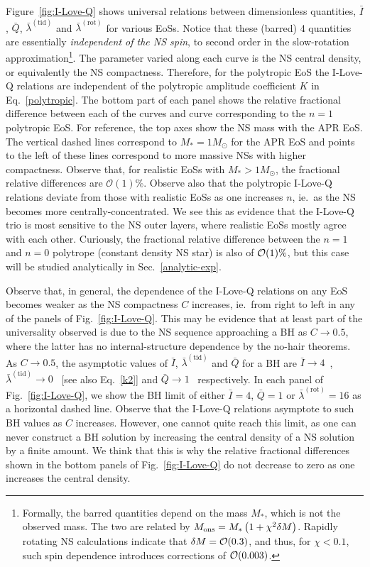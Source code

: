 \documentclass[aps,twocolumn,nofootinbib,showpacs,superscriptaddress,hyperref]{revtex4-1}
\newcommand{\NS}{*}
\newcommand{\tid}{\mathrm{(tid)}}
\newcommand{\rot}{\mathrm{(rot)}}
\newcommand{\Ibar}{\bar{I}}
\newcommand{\Qbar}{\bar{Q}}
\newcommand{\lambdabarrot}{\bar{\lambda}^\mathrm{(rot)}}
\begin{document}
Figure~\ref{fig:I-Love-Q} shows universal relations between dimensionless quantities, $\bar{I}$, $\Qbar$, $\bar{\lambda}^\tid$ and $\bar{\lambda}^\rot$ for various EoSs. Notice that these (barred) 4 quantities are essentially {\emph{independent of the NS spin}}, to second order in the slow-rotation approximation\footnote{Formally, the barred quantities depend on the mass $M_{*}$, which is not the observed mass. The two are related by $M_{\rm ons} = M_{*} \left(1 + \chi^{2} \delta M\right)$. Rapidly rotating NS calculations indicate that $\delta M = {\cal{O}}(0.3)$, and thus, for $\chi < 0.1$, such spin dependence introduces corrections of ${\cal{O}}(0.003)$.}.  The parameter varied along each curve is the NS central density, or equivalently the NS compactness. Therefore, for the polytropic EoS the I-Love-Q relations are independent of the polytropic amplitude coefficient $K$ in Eq.~\eqref{polytropic}. The bottom part of each panel shows the relative fractional difference between each of the curves and curve corresponding to the $n=1$ polytropic EoS. For reference, the top axes show the NS mass with the APR EoS. The vertical dashed lines correspond to $M_\NS=1M_\odot$ for the APR EoS and points to the left of these lines correspond to more massive NSs with higher compactness. Observe that, for realistic EoSs with $M_\NS>1M_\odot$, the fractional relative differences are $\mathcal{O}(1)\%$. Observe also that the polytropic I-Love-Q relations deviate from those with realistic EoSs as one increases $n$, ie.~as the NS becomes more centrally-concentrated. We see this as evidence that the I-Love-Q trio is most sensitive to the NS outer layers, where realistic EoSs mostly agree with each other. Curiously, the fractional relative difference between the $n=1$ and $n=0$ polytrope (constant density NS star) is also of ${\cal{O}}(1)\%$, but this case will be studied analytically in Sec.~\ref{analytic-exp}.

Observe that, in general, the dependence of the I-Love-Q relations on any EoS becomes weaker as the NS compactness $C$ increases, ie.~from right to left in any of the panels of Fig.~\ref{fig:I-Love-Q}. This may be evidence that at least part of the universality observed is due to the NS sequence approaching a BH as $C \to 0.5$, where the latter has no internal-structure dependence by the no-hair theorems. As $C \to 0.5$, the asymptotic values of $\bar{I}$, $\bar{\lambda}^\tid$ and $\Qbar$ for a BH are $\bar{I} \to 4$~\cite{membrane}, $\bar{\lambda}^\tid \to 0$~\cite{binnington-poisson} [see also Eq.~\eqref{k2}] and $\Qbar \to 1$~\cite{geroch,hansen,poisson-quadrupole} respectively. In each panel of Fig.~\ref{fig:I-Love-Q}, we show the BH limit of either $\Ibar=4$, $\Qbar =1$ or $\lambdabarrot = 16$ as a horizontal dashed line. Observe that the I-Love-Q relations asymptote to such BH values as $C$ increases. However, one cannot quite reach this limit, as one can never construct a BH solution by increasing the central density of a NS solution by a finite amount. We think that this is why the relative fractional differences shown in the bottom panels of Fig.~\ref{fig:I-Love-Q} do not decrease to zero as one increases the central density. 
\end{document}
